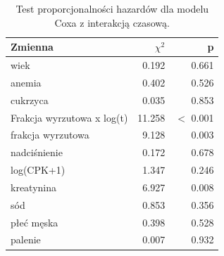 \begin{table}[htbp]
\centering
\caption{Test proporcjonalności hazardów dla modelu Coxa z interakcją czasową.}
\label{tab:ph-cox-time}
\small
\setlength{\tabcolsep}{1.5pt}
\begin{tabular}{lrr}
\toprule
Zmienna & $\chi^2$ & p \\
\midrule
wiek & 0.192 & 0.661 \\
anemia & 0.402 & 0.526 \\
cukrzyca & 0.035 & 0.853 \\
Frakcja wyrzutowa x log(t) & 11.258 & $<$ 0.001 \\
frakcja wyrzutowa & 9.128 & 0.003 \\
nadciśnienie & 0.172 & 0.678 \\
log(CPK+1) & 1.347 & 0.246 \\
kreatynina & 6.927 & 0.008 \\
sód & 0.853 & 0.356 \\
płeć męska & 0.398 & 0.528 \\
palenie & 0.007 & 0.932 \\
\bottomrule
\end{tabular}
\end{table}
